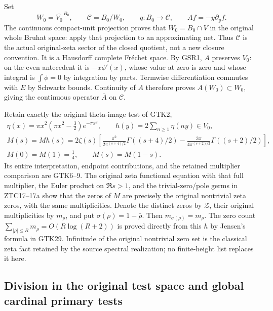 Set
\begin{equation}\tag{GSR2}
 W_0=\overline{V_0}^{\,B_0},\qquad
 \mathcal C=B_0/W_0,\qquad q:B_0\longrightarrow\mathcal C,\qquad
 A f=-y\partial_y f .
\end{equation}
The continuous compact-unit projection proves that
$W_0=B_0\cap\overline V$ in the original whole Bruhat
space: apply that projection to an approximating net.
Thus $\mathcal C$ is the actual original-zeta sector of
the closed quotient, not a new closure convention.
It is a Hausdorff complete Fréchet space. By GSR1,
$A$ preserves $V_0$: on the even antecedent it is
$-x\phi'(x)$, whose value at zero is zero and whose
integral is $\int\phi=0$ by integration by parts.
Termwise differentiation commutes with $E$ by Schwartz
bounds. Continuity of $A$ therefore proves
$A(W_0)\subset W_0$, giving the continuous operator
$\bar A$ on $\mathcal C$.

Retain exactly the original theta-image test of GTK2,
\begin{equation}\tag{GSR3}
 \begin{gathered}
 \eta(x)=\pi x^2(\pi x^2-\tfrac32)e^{-\pi x^2},\qquad
 h(y)=2\sum_{n\ge1}\eta(ny)\in V_0,\\
 M(s)=Mh(s)=2\zeta(s)\left[
 \frac{\pi^2}{2\pi^{(s+4)/2}}\Gamma((s+4)/2)
 -\frac{3\pi}{4\pi^{(s+2)/2}}\Gamma((s+2)/2)\right],\\
 M(0)=M(1)=\tfrac14,\qquad M(s)=M(1-s).
 \end{gathered}
\end{equation}
Its entire interpretation, endpoint contributions, and the
retained multiplier comparison are GTK6--9. The original
zeta functional equation with that full multiplier, the
Euler product on $\Re s>1$, and the trivial-zero/pole
germs in ZTC17--17a show that the zeros of $M$ are
precisely the original nontrivial zeta zeros, with the
same multiplicities. Denote the distinct zeros by
$\mathcal Z$, their original multiplicities by $m_\rho$,
and put $\sigma(\rho)=1-\bar\rho$. Then
$m_{\sigma(\rho)}=m_\rho$. The zero count
$\sum_{|\rho|\le R}m_\rho=O(R\log(R+2))$ is proved
directly from this $h$ by Jensen's formula in GTK29.
Infinitude of the original nontrivial zero set is the
classical zeta fact retained by the source spectral
realization; no finite-height list replaces it here.

\subsection{Division in the original test space and global cardinal primary tests}

